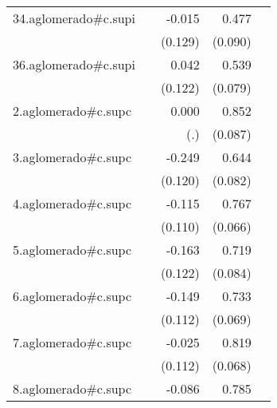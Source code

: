 {\begin{longtable}{l*{4}{D{.}{.}{-1}}}
\addlinespace
34.aglomerado#c.supi&                     &      -0.015         &       0.477\sym{***}&                     \\
            &                     &     (0.129)         &     (0.090)         &                     \\
\addlinespace
36.aglomerado#c.supi&                     &       0.042         &       0.539\sym{***}&                     \\
            &                     &     (0.122)         &     (0.079)         &                     \\
\addlinespace
2.aglomerado#c.supc&                     &       0.000         &       0.852\sym{***}&                     \\
            &                     &         (.)         &     (0.087)         &                     \\
\addlinespace
3.aglomerado#c.supc&                     &      -0.249\sym{*}  &       0.644\sym{***}&                     \\
            &                     &     (0.120)         &     (0.082)         &                     \\
\addlinespace
4.aglomerado#c.supc&                     &      -0.115         &       0.767\sym{***}&                     \\
            &                     &     (0.110)         &     (0.066)         &                     \\
\addlinespace
5.aglomerado#c.supc&                     &      -0.163         &       0.719\sym{***}&                     \\
            &                     &     (0.122)         &     (0.084)         &                     \\
\addlinespace
6.aglomerado#c.supc&                     &      -0.149         &       0.733\sym{***}&                     \\
            &                     &     (0.112)         &     (0.069)         &                     \\
\addlinespace
7.aglomerado#c.supc&                     &      -0.025         &       0.819\sym{***}&                     \\
            &                     &     (0.112)         &     (0.068)         &                     \\
\addlinespace
8.aglomerado#c.supc&                     &      -0.086         &       0.785\sym{***}&                     \\

\end{longtable}}

